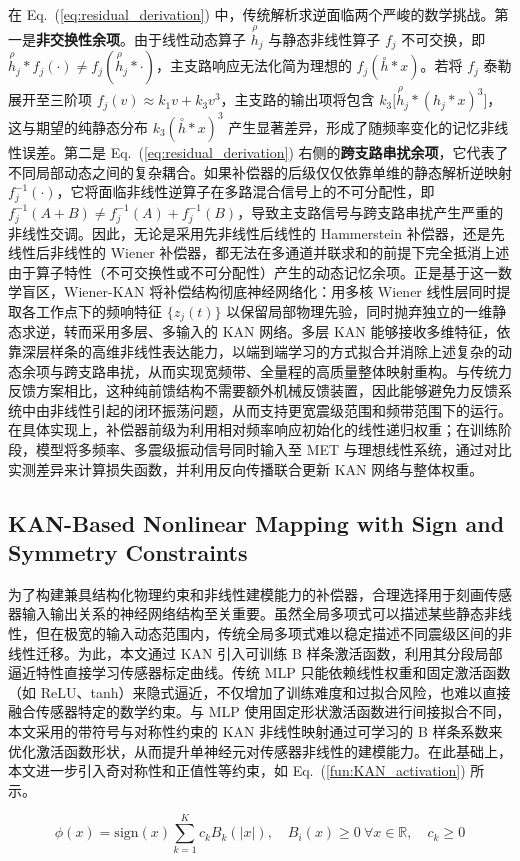 \documentclass[sn-nature]{sn-jnl}
\newif\ifCNENEnglish
\newif\ifCNENBilingual
\newcommand{\CNEN}[2]{%
    \ifCNENBilingual
        #1%
        \if\relax\detokenize{#2}\relax\else\par #2\fi%
    \else
        \ifCNENEnglish
            #2%
        \else
            #1%
        \fi
    \fi
}
\newcommand{\relative}[1]{\overset{\rho}{#1}} %
\newcommand{\ideal}[1]{\overset{\circ}{#1}} %
\begin{document}
\CNEN{在 Eq.~(\ref{eq:residual_derivation}) 中，传统解析求逆面临两个严峻的数学挑战。第一是\textbf{非交换性余项}。由于线性动态算子 $\relative{h}_j$ 与静态非线性算子 $f_j$ 不可交换，即 $\relative{h}_j * f_j(\cdot) \neq f_j(\relative{h}_j * \cdot)$，主支路响应无法化简为理想的 $f_j(\ideal{h} * x)$。若将 $f_j$ 泰勒展开至三阶项 $f_j(v) \approx k_1 v + k_3 v^3$，主支路的输出项将包含 $k_3 \big[ \relative{h}_j * (h_j * x)^3 \big]$，这与期望的纯静态分布 $k_3 (\ideal{h} * x)^3$ 产生显著差异，形成了随频率变化的记忆非线性误差。第二是 Eq.~(\ref{eq:residual_derivation}) 右侧的\textbf{跨支路串扰余项}，它代表了不同局部动态之间的复杂耦合。如果补偿器的后级仅仅依靠单维的静态解析逆映射 $f_j^{-1}(\cdot)$，它将面临非线性逆算子在多路混合信号上的不可分配性，即 $f_j^{-1}(A + B) \neq f_j^{-1}(A) + f_j^{-1}(B)$，导致主支路信号与跨支路串扰产生严重的非线性交调。因此，无论是采用先非线性后线性的 Hammerstein 补偿器，还是先线性后非线性的 Wiener 补偿器，都无法在多通道并联求和的前提下完全抵消上述由于算子特性（不可交换性或不可分配性）产生的动态记忆余项。正是基于这一数学盲区，Wiener-KAN 将补偿结构彻底神经网络化：用多核 Wiener 线性层同时提取各工作点下的频响特征 $\{z_j(t)\}$ 以保留局部物理先验，同时抛弃独立的一维静态求逆，转而采用多层、多输入的 KAN 网络。多层 KAN 能够接收多维特征，依靠深层样条的高维非线性表达能力，以端到端学习的方式拟合并消除上述复杂的动态余项与跨支路串扰，从而实现宽频带、全量程的高质量整体映射重构。与传统力反馈方案相比，这种纯前馈结构不需要额外机械反馈装置，因此能够避免力反馈系统中由非线性引起的闭环振荡问题，从而支持更宽震级范围和频带范围下的运行。在具体实现上，补偿器前级为利用相对频率响应初始化的线性递归权重；在训练阶段，模型将多频率、多震级振动信号同时输入至 MET 与理想线性系统，通过对比实测差异来计算损失函数，并利用反向传播联合更新 KAN 网络与整体权重。}{}

\subsection{KAN-Based Nonlinear Mapping with Sign and Symmetry Constraints}

\CNEN{为了构建兼具结构化物理约束和非线性建模能力的补偿器，合理选择用于刻画传感器输入输出关系的神经网络结构至关重要。虽然全局多项式可以描述某些静态非线性，但在极宽的输入动态范围内，传统全局多项式难以稳定描述不同震级区间的非线性迁移。为此，本文通过 KAN 引入可训练 B 样条激活函数，利用其分段局部逼近特性直接学习传感器标定曲线。传统 MLP 只能依赖线性权重和固定激活函数（如 ReLU、tanh）来隐式逼近，不仅增加了训练难度和过拟合风险，也难以直接融合传感器特定的数学约束。与 MLP 使用固定形状激活函数进行间接拟合不同，本文采用的带符号与对称性约束的 KAN 非线性映射通过可学习的 B 样条系数来优化激活函数形状，从而提升单神经元对传感器非线性的建模能力\cite{livierisCKANNewApproach2024}。在此基础上，本文进一步引入奇对称性和正值性等约束，如 Eq.~(\ref{fun:KAN_activation}) 所示。}{}\begin{equation}
    \phi(x) = \text{sign}(x) \sum_{k=1}^{K} c_k B_k(|x|), \quad B_i(x) \geq 0 \ \forall x \in \mathbb{R}, \quad c_k \geq 0
    \label{fun:KAN_activation}
\end{equation}
\end{document}
